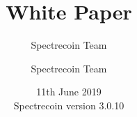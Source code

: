 \documentclass[a4paper,12pt]{article}
\begin{document}
\author{Spectrecoin Team}
\author{Spectrecoin Team}
\title{White Paper}
\date{11th June 2019\\
	Spectrecoin version 3.0.10}

\maketitle
\tableofcontents

\setlength{\arrayrulewidth}{.5mm}
\setlength{\tabcolsep}{10pt}
\renewcommand{\arraystretch}{1.5}


















\end{document}
